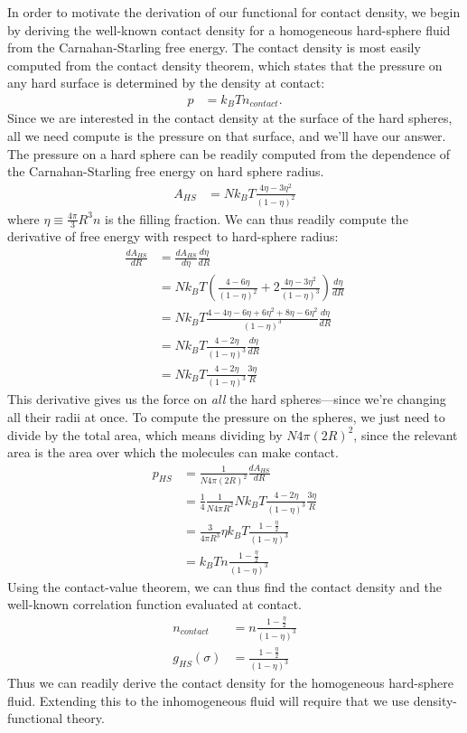 \documentclass[letterpaper,twocolumn,amsmath,amssymb,prb]{revtex4-1}
\newcommand{\derivation}[1]{#1} %
\begin{document}
In order to motivate the derivation of our functional for contact
density, we begin by deriving the well-known contact density for a
homogeneous hard-sphere fluid from the Carnahan-Starling free energy.
The contact density is most easily computed from the contact density
theorem, which states that the pressure on any hard surface is
determined by the density at contact:
\begin{align}
  p &= k_BT n_\textit{contact}.
\end{align}
Since we are interested in the contact density at the surface of the
hard spheres, all we need compute is the pressure on that surface, and
we'll have our answer.  The pressure on a hard sphere can be readily
computed from the dependence of the Carnahan-Starling free energy on
hard sphere radius.
\begin{align}
  A_{HS} &= Nk_BT \frac{4\eta - 3\eta^2}{(1-\eta)^2}
\end{align}
where $\eta \equiv \frac{4\pi}{3} R^3 n$ is the filling fraction.  We
can thus readily compute the derivative of free energy with respect to
hard-sphere radius:
\begin{align}
  \frac{dA_{HS}}{dR} &= \frac{dA_{HS}}{d\eta} \frac{d\eta}{dR} \\
  \derivation{
    &= Nk_BT \left( \frac{4 - 6\eta}{(1-\eta)^2} + 2 \frac{4\eta - 3\eta^2}{(1-\eta)^3} \right) \frac{d\eta}{dR}
    \\
    &= Nk_BT \frac{4 - 4\eta - 6\eta + 6\eta^2 + 8\eta - 6\eta^2}{(1-\eta)^3} \frac{d\eta}{dR}
    \\
    &= Nk_BT \frac{4 - 2\eta}{(1-\eta)^3} \frac{d\eta}{dR}
    \\
  }
  &= Nk_BT \frac{4 - 2\eta}{(1-\eta)^3} \frac{3 \eta}{R} \label{eq:dAhsdR}
\end{align}
This derivative gives us the force on \emph{all} the hard
spheres---since we're changing all their radii at once.  To compute
the pressure on the spheres, we just need to divide by the total area,
which means dividing by $N 4\pi (2R)^2$, since the relevant area
is the area over which the molecules can make contact.
\begin{align}
  p_{HS} &= \frac{1}{N 4\pi (2R)^2} \frac{dA_{HS}}{dR} \\
  \derivation{
    &= \frac14 \frac{1}{N 4\pi R^2} Nk_BT \frac{4 - 2\eta}{(1-\eta)^3} \frac{3 \eta}{R} \\
    &= \frac{3}{4\pi R^3} \eta k_BT \frac{1 -
      \frac{\eta}2}{(1-\eta)^3} \\
  }
  &= k_BT n \frac{1 - \frac{\eta}2}{(1-\eta)^3}
\end{align}
Using the contact-value theorem, we can thus find the contact density
and the well-known correlation function evaluated at contact.
\begin{align}
  n_\textit{contact} &= n \frac{1 - \frac{\eta}2}{(1-\eta)^3} \\
  g_{HS}(\sigma) &= \frac{1 - \frac{\eta}2}{(1-\eta)^3}
\end{align}
Thus we can readily derive the contact density for the homogeneous
hard-sphere fluid.  Extending this to the inhomogeneous fluid will
require that we use density-functional theory.
\end{document}

